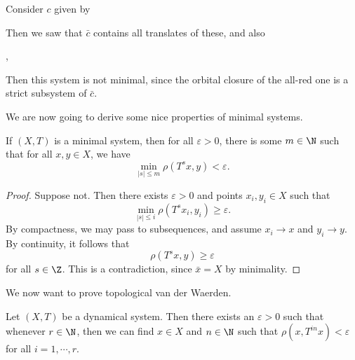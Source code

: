 \documentclass[a4paper]{article}
\begin{document}
\begin{eg}
  Consider $c$ given by
  \begin{center}
  \end{center}
  Then we saw that $\bar{c}$ contains all translates of these, and also
  \begin{center}
    ,
    \quad
  \end{center}
  Then this system is not minimal, since the orbital closure of the all-red one is a strict subsystem of $\bar{c}$.
\end{eg}

We are now going to derive some nice properties of minimal systems.
\begin{lemma}
  If $(X, T)$ is a minimal system, then for all $\varepsilon > 0$, there is some $m \in \N$ such that for all $x, y \in X$, we have
  \[
    \min_{|s| \leq m} \rho(T^s x, y) < \varepsilon.
  \]
\end{lemma}

\begin{proof}
  Suppose not. Then there exists $\varepsilon > 0$ and points $x_i, y_i \in X$ such that
  \[
    \min_{|s| \leq i} \rho(T^s x_i, y_i) \geq \varepsilon.
  \]
  By compactness, we may pass to subsequences, and assume $x_i \to x$ and $y_i \to y$. By continuity, it follows that
  \[
    \rho(T^s x, y) \geq \varepsilon
  \]
  for all $s \in \Z$. This is a contradiction, since $\bar{x} = X$ by minimality.
\end{proof}
We now want to prove topological van der Waerden.
\begin{thm}
  Let $(X, T)$ be a dynamical system. Then there exists an $\varepsilon > 0$ such that whenever $r \in\N$, then we can find $x \in X$ and $n \in \N$ such that $\rho(x, T^{in} x) < \varepsilon$ for all $i = 1, \cdots, r$.
\end{thm} %
\end{document}
